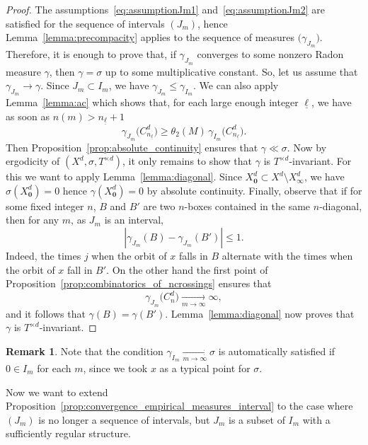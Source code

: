 \documentclass[10pt]{amsart}
\theoremstyle{definition}\newtheorem{defi}[theo]{Definition}\newtheorem{rema}[theo]{Remark}\newtheorem{exam}[theo]{Example}\newtheorem{exem}[theo]{Example}\newtheorem{nota}[theo]{Notation}
\newcommand{\tend}[3][]{\xrightarrow[#2\to#3]{#1}}
\newcommand{\cd}{C^{d}}
\newcommand{\td}{T^{\times d}}
\newcommand{\bz}{\boldsymbol{0}}
\newcommand{\lb}{\underline{\ell}}
\newcommand{\Gam}[1]{\gamma_{#1}\bigl(\cd_{n_{\lb}}\bigr)}
\begin{document}
\begin{proof}
The assumptions~\eqref{eq:assumptionJm1} and~\eqref{eq:assumptionJm2} are satisfied for the sequence of intervals $(J_m)$, hence Lemma~\ref{lemma:precompacity} applies to the sequence of measures $\big(\gamma_{J_m}\bigr)$. Therefore, it is enough to prove that, if $\gamma_{J_m}$ converges to some nonzero Radon measure $\gamma$, then $\gamma=\sigma$ up to some multiplicative constant. So, let us assume that $\gamma_{J_m}\to\gamma$. Since $J_m\subset I_m$, we have $\gamma_{J_m}\le \gamma_{I_m}$. We can also apply Lemma~\ref{lemma:ac} which shows that, for each large enough integer $\lb$, we have as soon as $n(m)>n_{\lb}+1$
\[
\Gam{J_m}\ge \theta_2(M)\, \Gam{I_m}.
\]
Then Proposition~\ref{prop:absolute_continuity} ensures that $\gamma\ll\sigma$. Now by ergodicity of $(X^d,\sigma,\td)$, it only remains to show that $\gamma$ is $\td$-invariant. For this we want to apply Lemma~\ref{lemma:diagonal}. Since $X_{\bz}^d\subset X^d\setminus X_\infty^d$, we have $\sigma(X_{\bz}^d)=0$ hence $\gamma(X_{\bz}^d)=0$ by absolute continuity. Finally, observe that if for some fixed integer $n$, $B$ and $B'$ are two $n$-boxes contained in the same $n$-diagonal, then for any $m$, as $J_m$ is an interval,
\[
\left| \gamma_{J_m}(B) - \gamma_{J_m}(B') \right|\le 1.
\]
Indeed, the times $j$ when the orbit of $x$ falls in $B$ alternate with the times when the orbit of $x$ fall in $B'$. On the other hand the first point of Proposition~\ref{prop:combinatorics_of_ncrossings} ensures that
\[
\gamma_{J_m}\bigl(\cd_n\bigr)\tend{m}{\infty}\infty,
\]
and it follows that $\gamma(B)=\gamma(B')$. Lemma~\ref{lemma:diagonal} now proves that $\gamma$ is $\td$-invariant.
\end{proof}

\begin{rema}
Note that the condition $\gamma_{I_m}\tend{m}{\infty}\sigma$ is automatically satisfied if $0\in I_m$ for each $m$, since we took $x$ as a typical point for $\sigma$.
\end{rema}

Now we want to extend Proposition~\ref{prop:convergence_empirical_measures_interval} to the case where $(J_m)$ is no longer a sequence of intervals, but $J_m$ is a subset of $I_m$ with a sufficiently regular structure.
\end{document}

